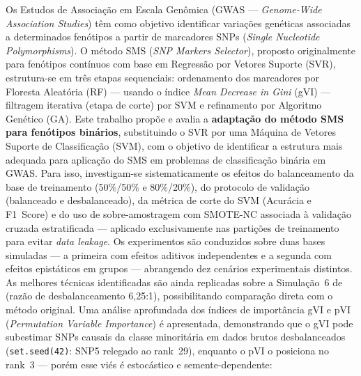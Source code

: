 \documentclass[
    12pt,
    a4paper,
    oneside,
    english,
    french,
    spanish,
    brazil
    ]{abntex2}
\begin{document}
\frenchspacing

\pretextual



\begin{SingleSpace}
\noindent
Os Estudos de Associação em Escala Genômica (GWAS --- \textit{Genome-Wide
Association Studies}) têm como objetivo identificar variações genéticas
associadas a determinados fenótipos a partir de marcadores SNPs
(\textit{Single Nucleotide Polymorphisms}). O método SMS (\textit{SNP Markers
Selector}), proposto originalmente para fenótipos contínuos com base em Regressão
por Vetores Suporte (SVR), estrutura-se em três etapas sequenciais: ordenamento
dos marcadores por Floresta Aleatória (RF) --- usando o índice \textit{Mean
Decrease in Gini} (gVI) --- filtragem iterativa (etapa de corte) por SVM e
refinamento por Algoritmo Genético (GA). Este trabalho propõe e avalia
a \textbf{adaptação do método SMS para fenótipos binários}, substituindo o SVR
por uma Máquina de Vetores Suporte de Classificação (SVM), com o objetivo de
identificar a estrutura mais adequada para aplicação do SMS em problemas de
classificação binária em GWAS. Para isso, investigam-se sistematicamente os efeitos
do balanceamento da base de treinamento (50\%/50\% e 80\%/20\%), do protocolo de
validação (balanceado e desbalanceado), da métrica de corte do SVM (Acurácia e
F1~Score) e do uso de sobre-amostragem com SMOTE-NC associada à validação cruzada
estratificada --- aplicado exclusivamente nas partições de treinamento para
evitar \textit{data leakage}. Os experimentos são conduzidos sobre duas bases
simuladas --- a primeira com efeitos aditivos independentes e a segunda com efeitos
epistáticos em grupos --- abrangendo dez cenários experimentais distintos. As
melhores técnicas identificadas são ainda replicadas sobre a Simulação~6 de
 (razão de desbalanceamento 6,25:1), possibilitando
comparação direta com o método original. Uma análise aprofundada dos índices de
importância gVI e pVI (\textit{Permutation Variable Importance}) é apresentada,
demonstrando que o gVI pode subestimar SNPs causais da classe minoritária em dados
brutos desbalanceados (\texttt{set.seed(42)}: SNP5 relegado ao rank~29), enquanto
o pVI o posiciona no rank~3 --- porém esse viés é estocástico e semente-dependente:

\end{SingleSpace}
\end{document}
